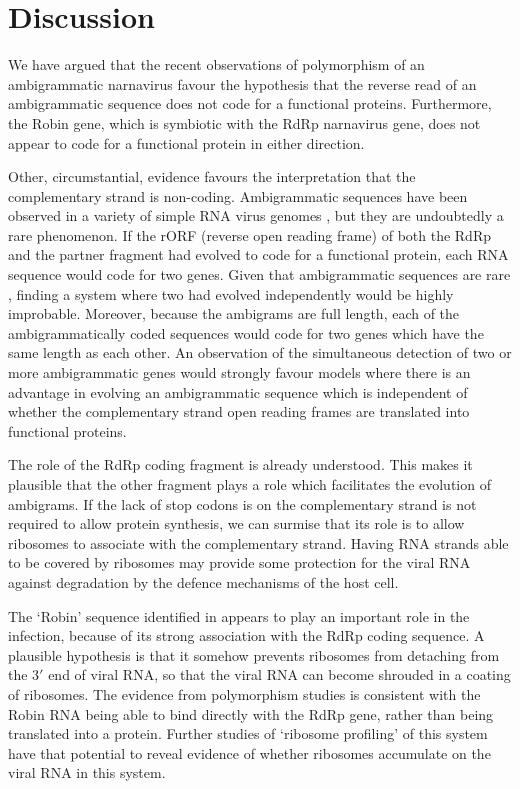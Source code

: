 \documentclass[9pt,lineno]{elife}
\begin{document}
\section{Discussion}
\label{sec: 6}
  
We have argued that the recent observations of polymorphism of an ambigrammatic 
narnavirus \cite{Bat+20} favour the hypothesis that the reverse read of an ambigrammatic sequence does 
not code for a functional proteins. Furthermore, the Robin gene, which is symbiotic with the RdRp 
narnavirus gene, does not appear to code for a functional protein in either direction.

Other, circumstantial, evidence favours the interpretation that the complementary strand is non-coding.
Ambigrammatic sequences have been observed in a variety of simple RNA virus genomes , 
but they are undoubtedly a rare phenomenon. 
If the rORF (reverse open reading frame) of both the RdRp and the partner fragment 
had evolved to code for a functional protein, each RNA sequence would code for two genes.
Given that ambigrammatic sequences are rare \cite{DeR+19}, finding a system where two had evolved 
independently would be highly improbable. Moreover, because the ambigrams are full length, 
each of the ambigrammatically coded sequences would code for two genes which have the same 
length as each other.
An observation of the simultaneous detection of two or more ambigrammatic genes would 
strongly favour models where there is an advantage in evolving an 
ambigrammatic sequence which is independent of whether the complementary strand open reading 
frames are translated into functional proteins.

The role of the RdRp coding fragment 
is already understood. This makes it plausible that the other fragment plays a role which facilitates the 
evolution of ambigrams. If the lack of stop codons is on the complementary strand is not required 
to allow protein synthesis, we can surmise that its role is to allow ribosomes to associate with the 
complementary strand. Having RNA strands able to be covered by ribosomes may provide some protection 
for the viral RNA against degradation by the defence mechanisms of the host cell. 

The \lq Robin' sequence identified in \cite{Bat+20} appears to play an important role in the infection, 
because of its strong association with the RdRp coding sequence. A plausible hypothesis is that 
it somehow prevents ribosomes from detaching from the $3'$ end of viral RNA, 
so that the viral RNA can become shrouded in a coating of ribosomes. 
The evidence from polymorphism studies is consistent with the Robin RNA being able to 
bind directly with the RdRp gene, rather than being translated into a protein.
Further studies of \lq ribosome profiling' of this system have that potential to reveal evidence 
of whether ribosomes accumulate on the viral RNA in this system.  
 
\end{document}
